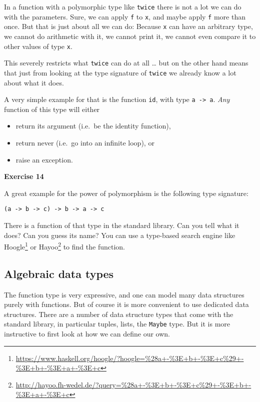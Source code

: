 \documentclass[11pt,
  american,
  DIV13]{article}
\DeclareRobustCommand{\href}[2]{#2\footnote{\url{#1}}}
\providecommand{\tightlist}{%
  \setlength{\itemsep}{0pt}\setlength{\parskip}{0pt}}
\begin{document}
In a function with a polymorphic type like \texttt{twice} there is not a
lot we can do with the parameters. Sure, we can apply \texttt{f} to
\texttt{x}, and maybe apply \texttt{f} more than once. But that is just
about all we can do: Because \texttt{x} can have an arbitrary type, we
cannot do arithmetic with it, we cannot print it, we cannot even compare
it to other values of type \texttt{x}.

This severely restricts what \texttt{twice} can do at all \ldots{} but
on the other hand means that just from looking at the type signature of
\texttt{twice} we already know a lot about what it does.

A very simple example for that is the function \texttt{id}, with type
\texttt{a\ -\textgreater{}\ a}. \emph{Any} function of this type will
either

\begin{itemize}
\tightlist
\item
  return its argument (i.e.~be the identity function),
\item
  return never (i.e.~go into an infinite loop), or
\item
  raise an exception.
\end{itemize}

\textbf{Exercise 14}

A great example for the power of polymorphism is the following type
signature:

\begin{verbatim}
(a -> b -> c) -> b -> a -> c
\end{verbatim}

There is a function of that type in the standard library. Can you tell
what it does? Can you guess its name? You can use a type-based search
engine like
\href{https://www.haskell.org/hoogle/?hoogle=\%28a+-\%3E+b+-\%3E+c\%29+-\%3E+b+-\%3E+a+-\%3E+c}{Hoogle}
or
\href{http://hayoo.fh-wedel.de/?query=\%28a+-\%3E+b+-\%3E+c\%29+-\%3E+b+-\%3E+a+-\%3E+c}{Hayoo}
to find the function.

\hypertarget{algebraic-data-types}{%
\subsection{Algebraic data types}\label{algebraic-data-types}}

The function type is very expressive, and one can model many data
structures purely with functions. But of course it is more convenient to
use dedicated data structures. There are a number of data structure
types that come with the standard library, in particular tuples, lists,
the \texttt{Maybe} type. But it is more instructive to first look at how
we can define our own.
\end{document}
